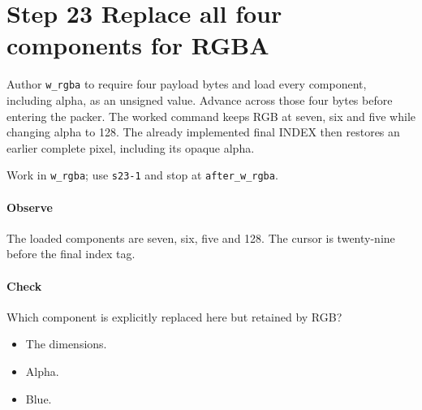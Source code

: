 \section{Step 23 Replace all four components for RGBA}\label{qoi-s23}
Author \texttt{w\_rgba} to require four payload bytes and load every component, including alpha, as an unsigned value. Advance across those four bytes before entering the packer. The worked command keeps RGB at seven, six and five while changing alpha to 128. The already implemented final INDEX then restores an earlier complete pixel, including its opaque alpha.

Work in \texttt{w\_rgba}; use \texttt{s23-1} and stop at \texttt{after\_w\_rgba}.

\paragraph{Observe} The loaded components are seven, six, five and 128. The cursor is twenty-nine before the final index tag.

\paragraph{Check} Which component is explicitly replaced here but retained by RGB?
\begin{itemize}
  \item[A.] The dimensions.
  \item[B.] Alpha.
  \item[C.] Blue.
\end{itemize}

